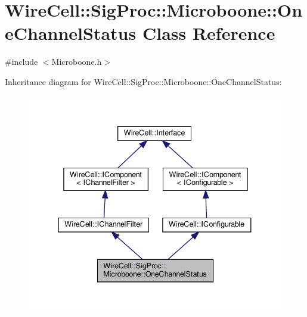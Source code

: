 \hypertarget{class_wire_cell_1_1_sig_proc_1_1_microboone_1_1_one_channel_status}{}\section{Wire\+Cell\+:\+:Sig\+Proc\+:\+:Microboone\+:\+:One\+Channel\+Status Class Reference}
\label{class_wire_cell_1_1_sig_proc_1_1_microboone_1_1_one_channel_status}


{\ttfamily \#include $<$Microboone.\+h$>$}



Inheritance diagram for Wire\+Cell\+:\+:Sig\+Proc\+:\+:Microboone\+:\+:One\+Channel\+Status\+:
\nopagebreak
\begin{figure}[H]
\begin{center}
\leavevmode
\includegraphics[width=338pt]{class_wire_cell_1_1_sig_proc_1_1_microboone_1_1_one_channel_status__inherit__graph}
\end{center}
\end{figure}


